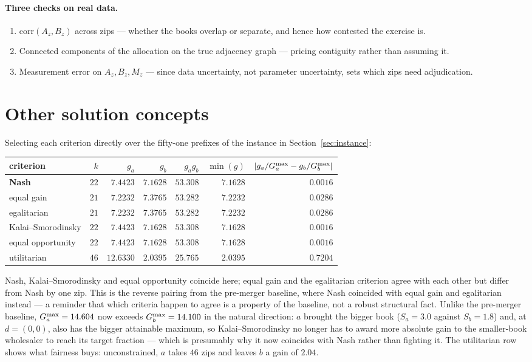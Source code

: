 \documentclass[11pt]{article}
\theoremstyle{remark}\newtheorem*{remark}{Remark}
\begin{document}
\paragraph{Three checks on real data.}
\begin{enumerate}[leftmargin=*,itemsep=2pt]
\item $\mathrm{corr}(A_z,B_z)$ across zips --- whether the books overlap or separate,
and hence how contested the exercise is.
\item Connected components of the allocation on the true adjacency graph --- pricing
contiguity rather than assuming it.
\item Measurement error on $A_z,B_z,M_z$ --- since data uncertainty, not parameter
uncertainty, sets which zips need adjudication.
\end{enumerate}

\appendix
\section{Other solution concepts}\label{app:other}
Selecting each criterion directly over the fifty-one prefixes of the instance in
Section~\ref{sec:instance}:

\begin{center}\begin{tabular}{lrrrrrr}\toprule
\textbf{criterion} & $k$ & $g_a$ & $g_b$ & $g_ag_b$ & $\min(g)$ & $|g_a/G_a^{\max}-g_b/G_b^{\max}|$\\
\midrule
\textbf{Nash} & $22$ & $7.4423$ & $7.1628$ & $\mathbf{53.308}$ & $7.1628$ & $0.0016$\\
equal gain & $21$ & $7.2232$ & $7.3765$ & $53.282$ & $7.2232$ & $0.0286$\\
egalitarian & $21$ & $7.2232$ & $7.3765$ & $53.282$ & $7.2232$ & $0.0286$\\
Kalai--Smorodinsky & $22$ & $7.4423$ & $7.1628$ & $53.308$ & $7.1628$ & $0.0016$\\
equal opportunity & $22$ & $7.4423$ & $7.1628$ & $53.308$ & $7.1628$ & $0.0016$\\
utilitarian & $46$ & $12.6330$ & $2.0395$ & $25.765$ & $2.0395$ & $0.7204$\\
\bottomrule\end{tabular}\end{center}

\noindent Nash, Kalai--Smorodinsky and equal opportunity coincide here; equal gain and
the egalitarian criterion agree with each other but differ from Nash by one zip. This is
the reverse pairing from the pre-merger baseline, where Nash coincided with equal gain
and egalitarian instead --- a reminder that which criteria happen to agree is a property
of the baseline, not a robust structural fact. Unlike the pre-merger baseline,
$G_a^{\max}=14.604$ now exceeds $G_b^{\max}=14.100$ in the natural direction: $a$ brought the
bigger book ($S_a=3.0$ against $S_b=1.8$) and, at $d=(0,0)$, also has the bigger
attainable maximum, so Kalai--Smorodinsky no longer has to award more absolute gain to
the smaller-book wholesaler to reach its target fraction --- which is presumably why it
now coincides with Nash rather than fighting it. The utilitarian row shows what fairness
buys: unconstrained, $a$ takes $46$ zips and leaves $b$ a gain of $2.04$.
\end{document}
